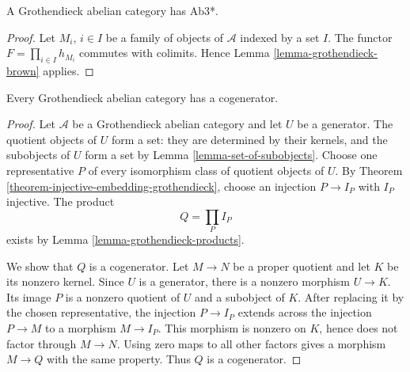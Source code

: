 \begin{lemma}
\label{lemma-grothendieck-products}
A Grothendieck abelian category has Ab3*.
\end{lemma}

\begin{proof}
Let $M_i$, $i \in I$ be a family of objects of $\mathcal{A}$ indexed
by a set $I$. The functor $F = \prod_{i \in I} h_{M_i}$
commutes with colimits. Hence
Lemma \ref{lemma-grothendieck-brown}
applies.
\end{proof}

\begin{lemma}
\label{lemma-grothendieck-cogenerator}
\begin{reference}
\cite[Chapter I, \S 1.9, p. 135]{Tohoku}
\end{reference}
Every Grothendieck abelian category has a cogenerator.
\end{lemma}

\begin{proof}
Let $\mathcal{A}$ be a Grothendieck abelian category and let $U$ be a
generator. The quotient objects of $U$ form a set: they are determined by
their kernels, and the subobjects of $U$ form a set by
Lemma \ref{lemma-set-of-subobjects}. Choose one representative $P$ of every
isomorphism class of quotient objects of $U$. By
Theorem \ref{theorem-injective-embedding-grothendieck}, choose an injection
$P \to I_P$ with $I_P$ injective. The product
$$
Q = \prod_P I_P
$$
exists by Lemma \ref{lemma-grothendieck-products}.

We show that $Q$ is a cogenerator. Let $M \to N$ be a proper quotient and
let $K$ be its nonzero kernel. Since $U$ is a generator, there is a nonzero
morphism $U \to K$. Its image $P$ is a nonzero quotient of $U$ and a
subobject of $K$. After replacing it by the chosen representative, the
injection $P \to I_P$ extends across the injection $P \to M$ to a morphism
$M \to I_P$. This morphism is nonzero on $K$, hence does not factor through
$M \to N$. Using zero maps to all other factors gives a morphism
$M \to Q$ with the same property. Thus $Q$ is a cogenerator.
\end{proof}

